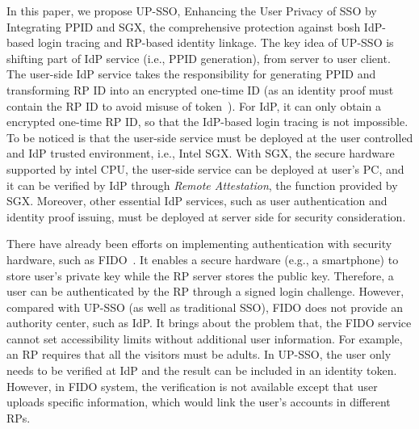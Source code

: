 In this paper, we propose UP-SSO, Enhancing the User Privacy of SSO by Integrating PPID and SGX, the comprehensive protection against bosh IdP-based login tracing and RP-based identity linkage.
The key idea of UP-SSO is shifting part of IdP service (i.e., PPID generation), from server to user client. 
The user-side IdP service takes the responsibility for generating PPID and transforming RP ID into an encrypted one-time ID (as an identity proof must contain the RP ID to avoid misuse of token~\cite{YangLCZ18, WangZLG16, MainkaMS16, MainkaMSW17}). 
For IdP, it can only obtain a encrypted one-time RP ID, so that the IdP-based login tracing is not impossible.
To be noticed is that the user-side service must be deployed at the user controlled and IdP trusted environment, i.e., Intel SGX. With SGX, the secure hardware supported by intel CPU, the user-side service can be deployed at user's PC, and it can be verified by IdP through \emph{Remote Attestation}, the function provided by SGX.
Moreover, other essential IdP services, such as user authentication and identity proof issuing,  must be deployed at server side for security consideration. 


There have already been efforts on implementing authentication with security hardware, such as FIDO~\cite{fidouaf,fidou2f}. It enables a secure hardware (e.g., a smartphone) to store user's private key while the RP server stores the public key. Therefore, a user can be authenticated by the RP through a signed login challenge. However, compared with UP-SSO (as well as traditional SSO), FIDO does not provide an authority center, such as IdP. It brings about the problem that, the FIDO service cannot set accessibility limits without additional user information. For example, an RP requires that all the visitors must be adults. 
In UP-SSO, the user only needs to be verified at IdP and the result can be included in an identity token. However, in FIDO system, the verification is not available except that user uploads specific information, which would link the user's accounts in different RPs. 


